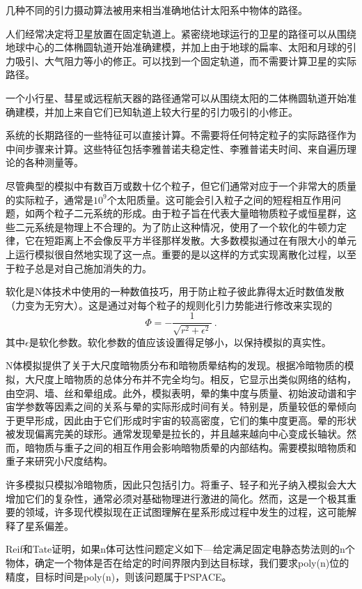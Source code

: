 几种不同的引力摄动算法被用来相当准确地估计太阳系中物体的路径。

人们经常决定将卫星放置在固定轨道上。紧密绕地球运行的卫星的路径可以从围绕地球中心的二体椭圆轨道开始准确建模，并加上由于地球的扁率、太阳和月球的引力吸引、大气阻力等小的修正。可以找到一个固定轨道，而不需要计算卫星的实际路径。

一个小行星、彗星或远程航天器的路径通常可以从围绕太阳的二体椭圆轨道开始准确建模，并加上来自它们已知轨道上较大行星的引力吸引的小修正。

系统的长期路径的一些特征可以直接计算。不需要将任何特定粒子的实际路径作为中间步骤来计算。这些特征包括李雅普诺夫稳定性、李雅普诺夫时间、来自遍历理论的各种测量等。

尽管典型的模拟中有数百万或数十亿个粒子，但它们通常对应于一个非常大的质量的实际粒子，通常是$10^9$个太阳质量。这可能会引入粒子之间的短程相互作用问题，如两个粒子二元系统的形成。由于粒子旨在代表大量暗物质粒子或恒星群，这些二元系统是物理上不合理的。为了防止这种情况，使用了一个软化的牛顿力定律，它在短距离上不会像反平方半径那样发散。大多数模拟通过在有限大小的单元上运行模拟很自然地实现了这一点。重要的是以这样的方式实现离散化过程，以至于粒子总是对自己施加消失的力。

软化是N体技术中使用的一种数值技巧，用于防止粒子彼此靠得太近时数值发散（力变为无穷大）。这是通过对每个粒子的规则化引力势能进行修改来实现的
\begin{equation}
\Phi=-\frac{1}{\sqrt{r^2+\epsilon^2}}~.
\end{equation}
其中$\epsilon$是软化参数。软化参数的值应该设置得足够小，以保持模拟的真实性。

N体模拟提供了关于大尺度暗物质分布和暗物质晕结构的发现。根据冷暗物质的模拟，大尺度上暗物质的总体分布并不完全均匀。相反，它显示出类似网络的结构，由空洞、墙、丝和晕组成。此外，模拟表明，晕的集中度与质量、初始波动谱和宇宙学参数等因素之间的关系与晕的实际形成时间有关。特别是，质量较低的晕倾向于更早形成，因此由于它们形成时宇宙的较高密度，它们的集中度更高。晕的形状被发现偏离完美的球形。通常发现晕是拉长的，并且越来越向中心变成长轴状。然而，暗物质与重子之间的相互作用会影响暗物质晕的内部结构。需要模拟暗物质和重子来研究小尺度结构。

许多模拟只模拟冷暗物质，因此只包括引力。将重子、轻子和光子纳入模拟会大大增加它们的复杂性，通常必须对基础物理进行激进的简化。然而，这是一个极其重要的领域，许多现代模拟现在正试图理解在星系形成过程中发生的过程，这可能解释了星系偏差。

Reif和Tate证明，如果n体可达性问题定义如下—给定满足固定电静态势法则的n个物体，确定一个物体是否在给定的时间界限内到达目标球，我们要求poly(n)位的精度，目标时间是poly(n)，则该问题属于PSPACE。

